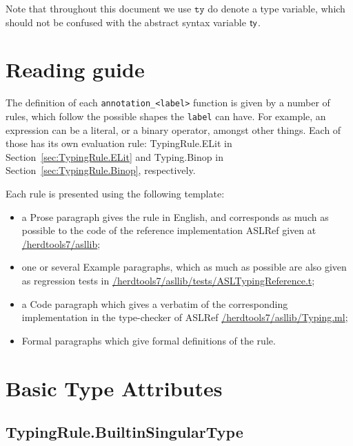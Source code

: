 \documentclass{book}
\newcommand\tty[0]{\texttt{ty}}
\begin{document}
Note that throughout this document we use $\tty$ do denote a type variable, which should not be confused with the abstract syntax variable $\textsf{ty}$.

\chapter{Reading guide}

The definition of each \texttt{annotation\_<label>} function is given by a number of
rules, which follow the possible shapes the \texttt{label} can have. For
example, an expression can be a literal, or a binary operator, amongst other
things. Each of those has its own evaluation rule: TypingRule.ELit in
Section~\ref{sec:TypingRule.ELit} and
Typing.Binop in Section~\ref{sec:TypingRule.Binop}, respectively.

Each rule is presented using the following template:
\begin{itemize}
\item a Prose paragraph gives the rule in English, and corresponds as much as possible to the code of the reference implementation ASLRef given at
\href{https://github.com/herd/herdtools7//tree/master/asllib}{/herdtools7/asllib};
\item one or several Example paragraphs, which as much as possible are also given as regression tests in
\href{https://github.com/herd/herdtools7//tree/master/asllib/tests/ASLTypingReference.t}{/herdtools7/asllib/tests/ASLTypingReference.t};
\item a Code paragraph which gives a verbatim of the corresponding implementation in the type-checker of ASLRef
\href{https://github.com/herd/herdtools7//tree/master/asllib/Typing.ml}{/herdtools7/asllib/Typing.ml};
\item Formal paragraphs which give formal definitions of the rule.
\end{itemize}

\chapter{Basic Type Attributes}

\section{TypingRule.BuiltinSingularType \label{sec:TypingRule.BuiltinSingularType}}
\end{document}

